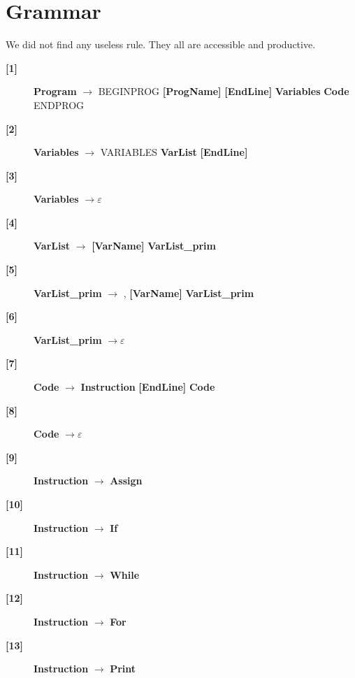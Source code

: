 \documentclass[12pt]{article}
\begin{document}
\section{Grammar}
We did not find any useless rule. They all are accessible and productive.
\begin{description}
\item[\textbf{[1]}]{ \textbf{\textlangle{}Program\textrangle{}}  $\rightarrow$ BEGINPROG \textbf{[ProgName]} \textbf{[EndLine]} \textbf{\textlangle{}Variables\textrangle{}}  \textbf{\textlangle{}Code\textrangle{}}  ENDPROG}
\item[\textbf{[2]}]{ \textbf{\textlangle{}Variables\textrangle{}}  $\rightarrow$ VARIABLES \textbf{\textlangle{}VarList\textrangle{}}  \textbf{[EndLine]}}
\item[\textbf{[3]}]{ \textbf{\textlangle{}Variables\textrangle{}}  $\rightarrow \varepsilon$}
\item[\textbf{[4]}]{ \textbf{\textlangle{}VarList\textrangle{}}  $\rightarrow$ \textbf{[VarName]} \textbf{\textlangle{}VarList\_prim\textrangle{}} }
\item[\textbf{[5]}]{ \textbf{\textlangle{}VarList\_prim\textrangle{}}  $\rightarrow$ , \textbf{[VarName]} \textbf{\textlangle{}VarList\_prim\textrangle{}} }
\item[\textbf{[6]}]{ \textbf{\textlangle{}VarList\_prim\textrangle{}}  $\rightarrow \varepsilon$}
\item[\textbf{[7]}]{ \textbf{\textlangle{}Code\textrangle{}}  $\rightarrow$ \textbf{\textlangle{}Instruction\textrangle{}}  \textbf{[EndLine]} \textbf{\textlangle{}Code\textrangle{}} }
\item[\textbf{[8]}]{ \textbf{\textlangle{}Code\textrangle{}}  $\rightarrow \varepsilon$}
\item[\textbf{[9]}]{ \textbf{\textlangle{}Instruction\textrangle{}}  $\rightarrow$ \textbf{\textlangle{}Assign\textrangle{}} }
\item[\textbf{[10]}]{ \textbf{\textlangle{}Instruction\textrangle{}}  $\rightarrow$ \textbf{\textlangle{}If\textrangle{}} }
\item[\textbf{[11]}]{ \textbf{\textlangle{}Instruction\textrangle{}}  $\rightarrow$ \textbf{\textlangle{}While\textrangle{}} }
\item[\textbf{[12]}]{ \textbf{\textlangle{}Instruction\textrangle{}}  $\rightarrow$ \textbf{\textlangle{}For\textrangle{}} }
\item[\textbf{[13]}]{ \textbf{\textlangle{}Instruction\textrangle{}}  $\rightarrow$ \textbf{\textlangle{}Print\textrangle{}} }

\end{description}
\end{document}
